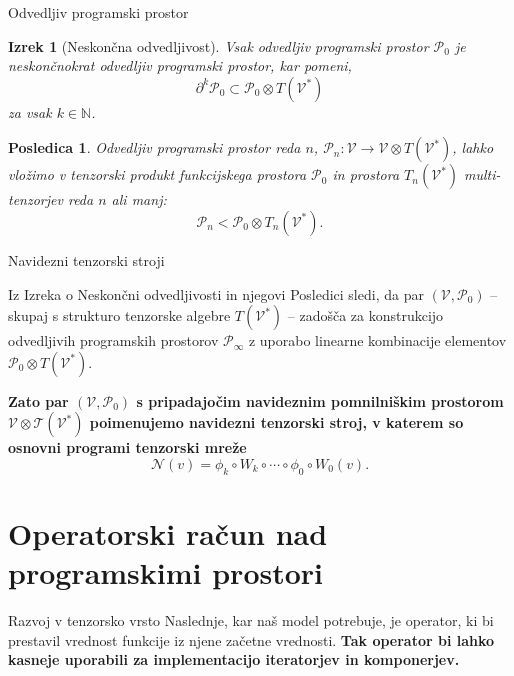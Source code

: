 \documentclass{beamer}
\newcommand{\T}{\mathcal{T}}
\newcommand{\VV}{\mathcal{V}}
\newcommand{\NN}{\mathcal{N}}
\newcommand{\dP}{\mathcal{P}}
\newcommand{\D}{\partial}
\newtheorem{izrek}{Izrek}[section]
\newtheorem{posledica}{Posledica}[section]
\begin{document}
\begin{frame}{Odvedljiv programski prostor}
\begin{izrek}[Neskončna odvedljivost]\label{thm:infDif}
Vsak odvedljiv programski prostor $\dP_0$ je \emph{neskončnokrat odvedljiv programski prostor}, kar pomeni,
\begin{equation*}\label{eq:P_n}
	 		\D^k\dP_0\subset\dP_0\otimes T(\VV^*)
	 	\end{equation*}
za vsak $k\in\mathbb{N}$.
\end{izrek}

\begin{posledica}\label{tenProdEmb}
Odvedljiv programski prostor reda $n$, $\dP_n:\VV\to\VV\otimes T(\VV^*)$, lahko vložimo v tenzorski produkt funkcijskega prostora $\dP_0$ in prostora $T_n(\VV^*)$ multi-tenzorjev reda $n$ ali manj:
\begin{equation*}
    \label{eq:D_p_embed}
    \dP_n<\dP_0\otimes T_n(\VV^*).
  \end{equation*}
\end{posledica}

\end{frame}

\begin{frame}{Navidezni tenzorski stroji}

Iz Izreka o Neskončni odvedljivosti in njegovi Posledici sledi, da par $(\VV, \dP_0)$ -- skupaj s strukturo tenzorske algebre $T(\VV^*)$ -- zadošča za konstrukcijo odvedljivih programskih prostorov $\dP_\infty$ z uporabo linearne kombinacije elementov $\dP_0\otimes T(\VV^*)$. 

\textbf{Zato par $(\VV, \dP_0)$ s pripadajočim navideznim pomnilniškim prostorom $\VV\otimes \T(\VV^*)$ poimenujemo navidezni tenzorski stroj, v katerem so osnovni programi tenzorski mreže}
\begin{equation*} \label{eq:tenWord}
\NN(v)=\phi_k\circ W_k\circ\cdots\circ\phi_0\circ W_0(v).
\end{equation*}

\end{frame}

\section{Operatorski račun nad programskimi prostori}

\begin{frame}{Razvoj v tenzorsko vrsto}
Naslednje, kar naš model potrebuje, je operator, ki bi prestavil vrednost
funkcije iz njene začetne vrednosti. \textbf{Tak operator bi lahko kasneje uporabili
za implementacijo iteratorjev in komponerjev.}
\end{frame}
\end{document}
